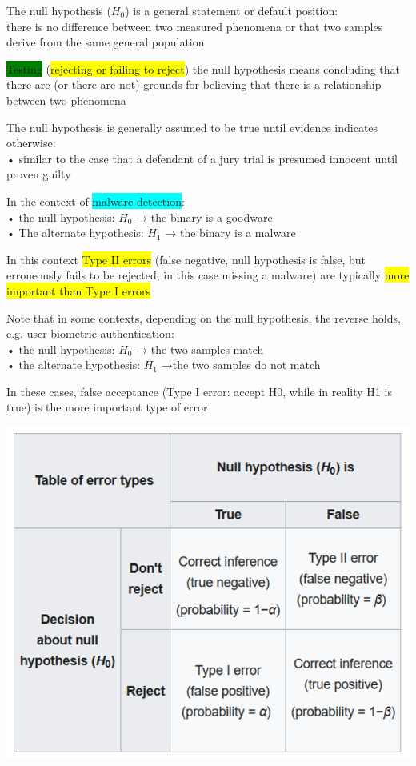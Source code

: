 \documentclass[]{project_plan}
\begin{document}
The null hypothesis ($H_0$) is a general statement or default position:\\
there is no difference between two measured phenomena or that two samples derive from the same general population

\colorbox{green}{Testing} (\colorbox{yellow}{rejecting or failing to reject}) the null hypothesis means concluding that there are (or there are not) grounds for believing that there is a relationship between two phenomena

The null hypothesis is generally assumed to be true until evidence indicates otherwise:\\
• similar to the case that a defendant of a jury trial is presumed innocent until proven guilty

In the context of \colorbox{cyan}{malware detection}:\\
• the null hypothesis: $H_0$ → the binary is a goodware\\
• The alternate hypothesis: $H_1$ → the binary is a malware

In this context \colorbox{yellow}{Type II errors} (false negative, null hypothesis is false, but erroneously fails to be rejected, in this case missing a malware) are typically \colorbox{yellow}{more important than Type I errors}

Note that in some contexts, depending on the null hypothesis, the reverse holds, e.g. user biometric authentication:\\
• the null hypothesis: $H_0$ → the two samples match\\
• the alternate hypothesis: $H_1$ →the two samples do not match

In these cases, false acceptance (Type I error: accept H0, while in reality
H1 is true) is the more important type of error

\includegraphics[width=.6\linewidth]{ml97.png}
\end{document}
